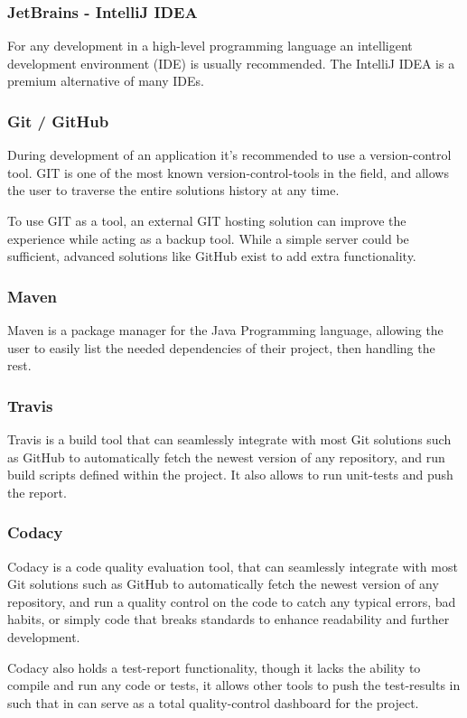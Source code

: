 \documentclass[a4paper]{article}
\begin{document}
\subsubsection{JetBrains - IntelliJ IDEA}
For any development in a high-level programming language an intelligent development environment
(IDE) is usually recommended. The IntelliJ IDEA is a premium alternative of many IDEs.

\subsubsection{Git / GitHub}
During development of an application it's recommended to use a version-control tool. GIT is
one of the most known version-control-tools in the field, and allows the user to traverse
the entire solutions history at any time.


To use GIT as a tool, an external GIT hosting solution can improve the experience while acting
as a backup tool. While a simple server could be sufficient, advanced solutions like GitHub
exist to add extra functionality.

\subsubsection{Maven}
Maven is a package manager for the Java Programming language, allowing the user to easily
list the needed dependencies of their project, then handling the rest.

\subsubsection{Travis}
Travis is a build tool that can seamlessly integrate with most Git solutions such as GitHub
to automatically fetch the newest version of any repository, and run build scripts defined
within the project. It also allows to run unit-tests and push the report.

\subsubsection{Codacy}
Codacy is a code quality evaluation tool, that can seamlessly integrate with most Git
solutions such as GitHub to automatically fetch the newest version of any repository,
and run a quality control on the code to catch any typical errors, bad habits, or
simply code that breaks standards to enhance readability and further development.


Codacy also holds a test-report functionality, though it lacks the ability to compile
and run any code or tests, it allows other tools to push the test-results in such that
in can serve as a total quality-control dashboard for the project.
\end{document}
